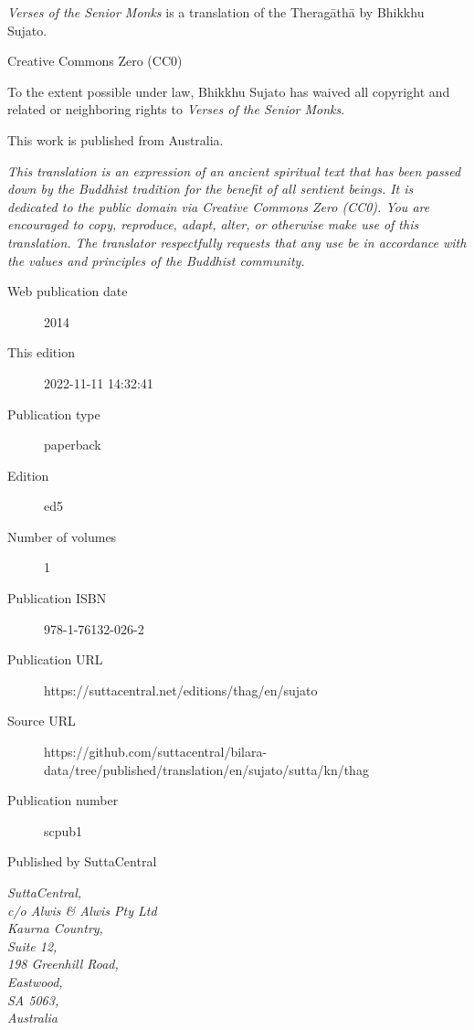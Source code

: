\documentclass[12pt,openany]{book}%
\begin{document}
\begin{footnotesize}

\textit{Verses of the Senior Monks} is a translation of the Theragāthā by Bhikkhu Sujato.

\medskip

Creative Commons Zero (CC0)

To the extent possible under law, Bhikkhu Sujato has waived all copyright and related or neighboring rights to \textit{Verses of the Senior Monks}.

\medskip

This work is published from Australia.

\begin{center}
\textit{This translation is an expression of an ancient spiritual text that has been passed down by the Buddhist tradition for the benefit of all sentient beings. It is dedicated to the public domain via Creative Commons Zero (CC0). You are encouraged to copy, reproduce, adapt, alter, or otherwise make use of this translation. The translator respectfully requests that any use be in accordance with the values and principles of the Buddhist community.}
\end{center}

\medskip

\begin{description}
    \item[Web publication date] 2014
    \item[This edition] 2022-11-11 14:32:41
    \item[Publication type] paperback
    \item[Edition] ed5
    \item[Number of volumes] 1
    \item[Publication ISBN] 978-1-76132-026-2
    \item[Publication URL] https://suttacentral.net/editions/thag/en/sujato
    \item[Source URL] https://github.com/suttacentral/bilara-data/tree/published/translation/en/sujato/sutta/kn/thag
    \item[Publication number] scpub1
\end{description}

\medskip

Published by SuttaCentral

\medskip

\textit{SuttaCentral,\\
c/o Alwis \& Alwis Pty Ltd\\
Kaurna Country,\\
Suite 12,\\
198 Greenhill Road,\\
Eastwood,\\
SA 5063,\\
Australia}

\end{footnotesize}
\end{document}
